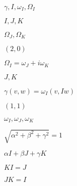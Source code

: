 \begin{preview}
\setcounter{equation}{0}%
\( \gamma , I , \omega_I , \Omega_I \)
\end{preview}

\begin{preview}
\setcounter{equation}{0}%
\( I,J,K \)
\end{preview}

\begin{preview}
\setcounter{equation}{0}%
\( \Omega_J, \Omega_K \)
\end{preview}

\begin{preview}
\setcounter{equation}{0}%
\( (2,0) \)
\end{preview}

\begin{preview}
\setcounter{equation}{0}%
\( \Omega_I = \omega_J + i\omega_K \)
\end{preview}

\begin{preview}
\setcounter{equation}{0}%
\( J,K \)
\end{preview}

\begin{preview}
\setcounter{equation}{0}%
\( \gamma(v,w) = \omega_I(v,Iw)  \)
\end{preview}

\begin{preview}
\setcounter{equation}{0}%
\( (1,1) \)
\end{preview}

\begin{preview}
\setcounter{equation}{0}%
\( \omega_I , \omega_J, \omega_K \)
\end{preview}

\begin{preview}
\setcounter{equation}{0}%
\( \sqrt{\alpha^{2} + \beta ^2 + \gamma ^2}=1 \)
\end{preview}

\begin{preview}
\setcounter{equation}{0}%
\( \alpha I + \beta J + \gamma K \)
\end{preview}

\begin{preview}
\setcounter{equation}{0}%
\( KI = J \)
\end{preview}

\begin{preview}
\setcounter{equation}{0}%
\( JK = I \)
\end{preview}

